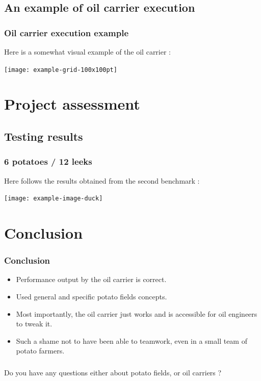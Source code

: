 \documentclass{beamer}
\begin{document}
\subsection{An example of oil carrier execution}

\begin{frame}
  \frametitle{Oil carrier execution example}
  Here is a somewhat visual example of the oil carrier :
  \begin{center}
    \texttt{[image: example-grid-100x100pt]}
  \end{center}
  
\end{frame}

\section{Project assessment}

\subsection{Testing results}

\begin{frame}
  \frametitle{6 potatoes / 12 leeks}
  Here follows the results obtained from the second benchmark :
  \begin{center}
    \texttt{[image: example-image-duck]}
  \end{center}
\end{frame}	

\section{Conclusion}

\begin{frame}
  \frametitle{Conclusion}
  \begin{itemize}
  \item Performance output by the oil carrier is correct.
  \item Used general and specific potato fields concepts. 
  \item Most importantly, the oil carrier just works and is accessible for oil engineers to tweak it.
  \item Such a shame not to have been able to teamwork, even in a small team of potato farmers.
  \end{itemize}
\end{frame}

\begin{frame}
  \frametitle{\null}
  Do you have any questions either about potato fields, or oil carriers ?
\end{frame}
\end{document}
